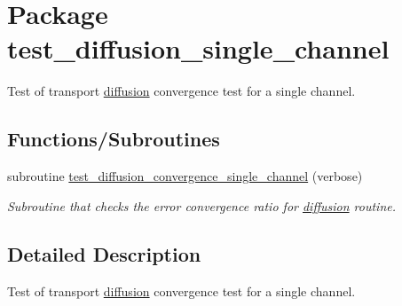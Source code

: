 \hypertarget{a00082}{
\section{Package test\_\-diffusion\_\-single\_\-channel}
\label{a00082}
}
Test of transport \hyperlink{a00056}{diffusion} convergence test for a single channel.  


\subsection*{Functions/Subroutines}
\begin{CompactItemize}
\item 
\hypertarget{a00082_0865c480561f8dccbceff9b671a77902}{
subroutine \hyperlink{a00082_0865c480561f8dccbceff9b671a77902}{test\_\-diffusion\_\-convergence\_\-single\_\-channel} (verbose)}
\label{a00082_0865c480561f8dccbceff9b671a77902}

\begin{CompactList}\small\item\em Subroutine that checks the error convergence ratio for \hyperlink{a00056}{diffusion} routine. \item\end{CompactList}\end{CompactItemize}


\subsection{Detailed Description}
Test of transport \hyperlink{a00056}{diffusion} convergence test for a single channel. 

